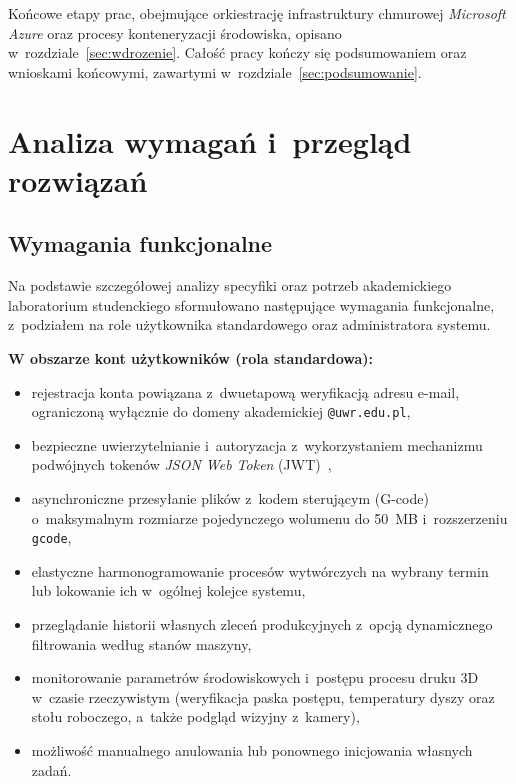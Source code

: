 \documentclass[a4paper,12pt,reqno]{article}
\begin{document}
Końcowe etapy prac, obejmujące orkiestrację infrastruktury chmurowej \textit{Microsoft Azure} oraz procesy konteneryzacji środowiska, opisano w~rozdziale~\ref{sec:wdrozenie}. %
Całość pracy kończy się podsumowaniem oraz wnioskami końcowymi, zawartymi w~rozdziale~\ref{sec:podsumowanie}.


\newpage


\section{Analiza wymagań i~przegląd rozwiązań}
\label{sec:analiza}

\subsection{Wymagania funkcjonalne}

Na podstawie szczegółowej analizy specyfiki oraz potrzeb akademickiego laboratorium studenckiego sformułowano następujące wymagania funkcjonalne, z~podziałem na role użytkownika standardowego oraz administratora systemu.

\noindent\textbf{W obszarze kont użytkowników (rola standardowa):}
\begin{itemize}
	\item rejestracja konta powiązana z~dwuetapową weryfikacją adresu e-mail, ograniczoną wyłącznie do domeny akademickiej \texttt{@uwr.edu.pl},
	\item bezpieczne uwierzytelnianie i~autoryzacja z~wykorzystaniem mechanizmu podwójnych tokenów \textit{JSON Web Token} (JWT)~\cite{jwt},
	\item asynchroniczne przesyłanie plików z~kodem sterującym (G-code) o~maksymalnym rozmiarze pojedynczego wolumenu do 50~MB i~rozszerzeniu \texttt{gcode},
	\item elastyczne harmonogramowanie procesów wytwórczych na wybrany termin lub lokowanie ich w~ogólnej kolejce systemu,
	\item przeglądanie historii własnych zleceń produkcyjnych z~opcją dynamicznego filtrowania według stanów maszyny,
	\item monitorowanie parametrów środowiskowych i~postępu procesu druku 3D w~czasie rzeczywistym (weryfikacja paska postępu, temperatury dyszy oraz stołu roboczego, a~także podgląd wizyjny z~kamery),
	\item możliwość manualnego anulowania lub ponownego inicjowania własnych zadań.
\end{itemize}
\end{document}
